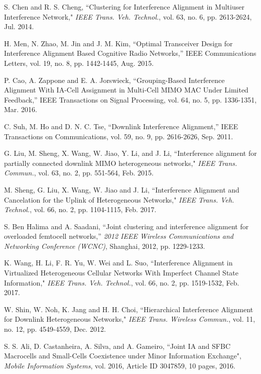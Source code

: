 \documentclass[journal]{IEEEtran}
\begin{document}
\begin{thebibliography}{1}
S. Chen and R. S. Cheng, ``Clustering for Interference Alignment in Multiuser Interference Network," \textit{IEEE Trans. Veh. Technol.}, vol. 63, no. 6, pp. 2613-2624, Jul. 2014. 

H. Men, N. Zhao, M. Jin and J. M. Kim, ``Optimal Transceiver Design for Interference Alignment Based Cognitive Radio Networks,” IEEE Communications Letters, vol. 19, no. 8, pp. 1442-1445, Aug. 2015.

P. Cao, A. Zappone and E. A. Jorswieck, ``Grouping-Based Interference Alignment With IA-Cell Assignment in Multi-Cell MIMO MAC Under Limited Feedback,” IEEE Transactions on Signal Processing, vol. 64, no. 5, pp. 1336-1351, Mar. 2016.

C. Suh, M. Ho and D. N. C. Tse, ``Downlink Interference Alignment,” IEEE Transactions on Communications, vol. 59, no. 9, pp. 2616-2626, Sep. 2011.

G. Liu, M. Sheng, X. Wang, W. Jiao, Y. Li, and J. Li, ``Interference alignment for partially connected downlink MIMO heterogeneous networks," \textit{IEEE Trans. Commun.}, vol. 63, no. 2, pp. 551-564, Feb. 2015.


M. Sheng, G. Liu, X. Wang, W. Jiao and J. Li, ``Interference Alignment and Cancelation for the Uplink of Heterogeneous Networks," \textit{IEEE Trans. Veh. Technol.}, vol. 66, no. 2, pp. 1104-1115, Feb. 2017.

S. Ben Halima and A. Saadani, ``Joint clustering and interference alignment for overloaded femtocell networks,” \textit{2012 IEEE Wireless Communications and Networking Conference (WCNC)}, Shanghai, 2012, pp. 1229-1233.

K. Wang, H. Li, F. R. Yu, W. Wei and L. Suo, ``Interference Alignment in Virtualized Heterogeneous Cellular Networks With Imperfect Channel State Information," \textit{IEEE Trans. Veh. Technol.}, vol. 66, no. 2, pp. 1519-1532, Feb. 2017. 

W. Shin, W. Noh, K. Jang and H. H. Choi, ``Hierarchical Interference Alignment for Downlink Heterogeneous Networks," \textit{IEEE Trans. Wireless Commun.}, vol. 11, no. 12, pp. 4549-4559, Dec. 2012.

S. S. Ali, D. Castanheira, A. Silva, and A. Gameiro, ``Joint IA and SFBC Macrocells and Small-Cells Coexistence under Minor Information Exchange", \textit{Mobile Information Systems}, vol. 2016, Article ID 3047859, 10 pages, 2016.


\end{thebibliography}
\end{document}
